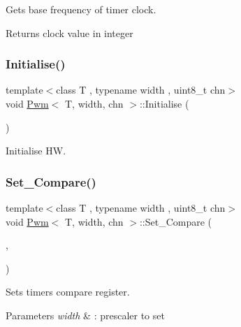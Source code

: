 Gets base frequency of timer clock. 

\begin{DoxyReturn}{Returns}
clock value in integer 
\end{DoxyReturn}
\mbox{\label{class_pwm_a174796ea6d1f39c67753331ad9c93c6d}} 
\subsubsection{\texorpdfstring{Initialise()}{Initialise()}}
{\footnotesize\ttfamily template$<$class T , typename width , uint8\+\_\+t chn$>$ \\
void \mbox{\hyperlink{class_pwm}{Pwm}}$<$ T, width, chn $>$\+::Initialise (\begin{DoxyParamCaption}\item[{void}]{ }\end{DoxyParamCaption})}



Initialise HW. 

\mbox{\label{class_pwm_a10bd78a2a720708e59b73f18af51edc2}} 
\subsubsection{\texorpdfstring{Set\_Compare()}{Set\_Compare()}}
{\footnotesize\ttfamily template$<$class T , typename width , uint8\+\_\+t chn$>$ \\
void \mbox{\hyperlink{class_pwm}{Pwm}}$<$ T, width, chn $>$\+::Set\+\_\+\+Compare (\begin{DoxyParamCaption}\item[{width}]{,  }\item[{uint8\+\_\+t}]{ }\end{DoxyParamCaption})}



Sets timer\textquotesingle{}s compare register. 


\begin{DoxyParams}{Parameters}
{\em width} & \+: prescaler to set \\
\hline
\end{DoxyParams}
\mbox{\label{class_pwm_aa258a3d3e68ac1294d13b0393cf9d168}} 
